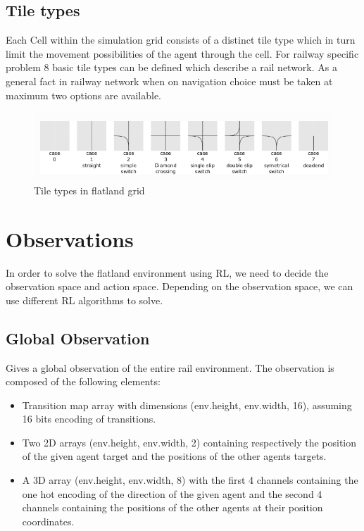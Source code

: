 \subsection{Tile types}
Each Cell within the simulation grid consists of a distinct tile type which in turn limit 
the movement possibilities of the agent through the cell. 
For railway specific problem 8 basic tile types can be defined which describe a rail network. 
As a general fact in railway network when on navigation choice must be taken at maximum two options 
are available.

\begin{figure}[h]
    \centering
    \includegraphics[width=1.0\textwidth]{flatland1}
    \caption{ Tile types in flatland grid \cite{WEBSITE:8} }
    \label{image-myimage2}
\end{figure}

\section {Observations}
In order to solve the flatland environment using RL, we need to decide the observation space and 
action space. Depending on the observation space, we can use different RL algorithms to solve.

\subsection{Global Observation}

Gives a global observation of the entire rail environment.
The observation is composed of the following elements:

\begin{itemize}
    \item Transition map array with dimensions (env.height, env.width, 16), assuming 16 bits encoding of transitions.
    \item Two 2D arrays (env.height, env.width, 2) containing respectively the position of the given agent target and the positions of the other agents targets.
    \item A 3D array (env.height, env.width, 8) with the first 4 channels containing the one hot encoding of the direction of the given agent and the second 4 channels containing the positions of the other agents at their position coordinates.
\end{itemize}

